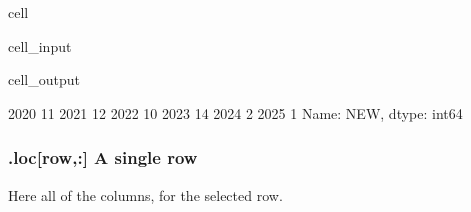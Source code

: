 \documentclass[letterpaper,10pt,english]{jupyterBook}
\begin{document}
\begin{sphinxuseclass}{cell}\begin{sphinxVerbatimInput}

\begin{sphinxuseclass}{cell_input}
\begin{sphinxVerbatim}[commandchars=\\\{\}]
\PYG{p}{[}\PYG{p}{]}
\end{sphinxVerbatim}

\end{sphinxuseclass}\end{sphinxVerbatimInput}
\begin{sphinxVerbatimOutput}

\begin{sphinxuseclass}{cell_output}
\begin{sphinxVerbatim}[commandchars=\\\{\}]
2020    11
2021    12
2022    10
2023    14
2024     2
2025     1
Name: NEW, dtype: int64
\end{sphinxVerbatim}

\end{sphinxuseclass}\end{sphinxVerbatimOutput}

\end{sphinxuseclass}

\subsubsection{.loc{[}row,:{]} A single row}
\label{\detokenize{content/04_PythonEssentials/PythonPandasDataframes:loc-row-a-single-row}}
\sphinxAtStartPar
Here all of the columns, for the selected row.
\end{document}
